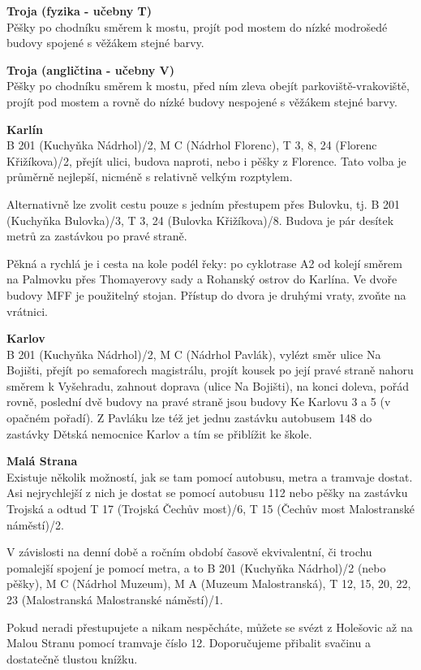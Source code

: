 \textbf{Troja (fyzika - učebny T)}\\
Pěšky po chodníku směrem k mostu, projít pod mostem do nízké modrošedé budovy
spojené s věžákem stejné barvy.

\textbf{Troja (angličtina - učebny V)}\\
Pěšky po chodníku směrem k mostu, před ním zleva obejít parkoviště-vrakoviště,
projít pod mostem a rovně do nízké budovy nespojené s věžákem stejné barvy.

\textbf{Karlín}\\
B 201 (Kuchyňka \ra Nádrhol)/2, M C (Nádrhol \ra Florenc), T 3, 8, 24 (Florenc
\ra Křižíkova)/2, přejít ulici, budova naproti, nebo i pěšky z Florence. Tato
volba je průměrně nejlepší, nicméně s relativně velkým rozptylem.

Alternativně lze zvolit cestu pouze s jedním přestupem přes Bulovku, tj. B 201
(Kuchyňka \ra Bulovka)/3, T 3, 24 (Bulovka \ra Křižíkova)/8. Budova je pár
desítek metrů za zastávkou po pravé straně.

Pěkná a rychlá je i cesta na kole podél řeky: po cyklotrase A2 od kolejí směrem
na Palmovku přes Thomayerovy sady a Rohanský ostrov do Karlína. Ve dvoře budovy
MFF je použitelný stojan. Přístup do dvora je druhými vraty, zvoňte na vrátnici.

\textbf{Karlov} \\
B 201 (Kuchyňka \ra Nádrhol)/2, M C (Nádrhol \ra Pavlák), vylézt směr ulice Na
Bojišti, přejít po semaforech magistrálu, projít kousek po její pravé straně
nahoru směrem k Vyšehradu, zahnout doprava (ulice Na Bojišti), na konci doleva,
pořád rovně, poslední dvě budovy na pravé straně jsou budovy Ke Karlovu 3 a 5 (v
opačném pořadí). Z Pavláku lze též jet jednu zastávku autobusem 148 do zastávky
Dětská nemocnice Karlov a tím se přiblížit ke škole.

\textbf{Malá Strana}\\
Existuje několik možností, jak se tam pomocí autobusu, metra a tramvaje dostat.
Asi nejrychlejší z nich je dostat se pomocí autobusu 112 nebo pěšky na zastávku
Trojská a odtud T 17 (Trojská \ra Čechův most)/6, T 15 (Čechův most \ra
Malostranské náměstí)/2.

V závislosti na denní době a ročním období časově ekvivalentní, či trochu
pomalejší spojení je pomocí metra, a to B 201 (Kuchyňka \ra Nádrhol)/2 (nebo
pěšky), M C (Nádrhol \ra Muzeum), M A (Muzeum \ra Malostranská), T 12, 15, 20,
22, 23 (Malostranská \ra Malostranské náměstí)/1.

Pokud neradi přestupujete a nikam nespěcháte, můžete se svézt z Holešovic až na
Malou Stranu pomocí tramvaje číslo 12. Doporučujeme přibalit svačinu a
dostatečně tlustou knížku.


